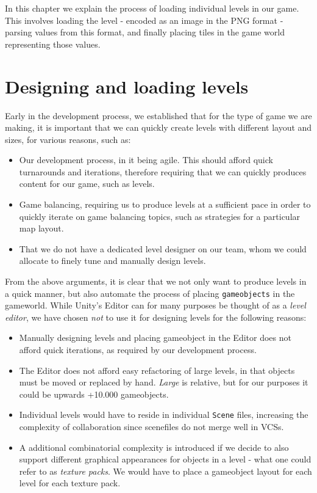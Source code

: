 In this chapter we explain the process of loading individual levels in our
game. This involves loading the level - encoded as an image in the PNG format -
parsing values from this format, and finally placing tiles in the game world
representing those values.

\section{Designing and loading levels}
Early in the development process, we established that for the type of game we
are making, it is important that we can quickly create levels with different
layout and sizes, for various reasons, such as:
\begin{itemize}
    \item Our development process, in it being agile. This should afford quick
        turnarounds and iterations, therefore requiring that we can quickly
        produces content for our game, such as levels.
    \item Game balancing, requiring us to produce levels at a sufficient pace in
        order to quickly iterate on game balancing topics, such as strategies
        for a particular map layout.
    \item That we do not have a dedicated level designer on our team, whom we
        could allocate to finely tune and manually design levels.
\end{itemize}

From the above arguments, it is clear that we not only want to produce levels
in a quick manner, but also automate the process of placing
\texttt{gameobjects} in the gameworld. While Unity's Editor can for many purposes
be thought of as a \textit{level editor}, we have chosen \textit{not} to use it
for designing levels for the following reasons:
\begin{itemize}
    \item Manually designing levels and placing gameobject in the Editor does
        not afford quick iterations, as required by our development process.
    \item The Editor does not afford easy refactoring of large levels, in that
        objects must be moved or replaced by hand. \textit{Large} is relative,
        but for our purposes it could be upwards +10.000 gameobjects.
    \item Individual levels would have to reside in individual \texttt{Scene}
        files, increasing the complexity of collaboration since scenefiles do
        not merge well in VCSs.
    \item A additional combinatorial complexity is introduced if we decide to
        also support different graphical appearances for objects in a level -
        what one could refer to as \textit{texture packs}. We would have
        to place a gameobject layout for each level for each texture pack.
\end{itemize}

